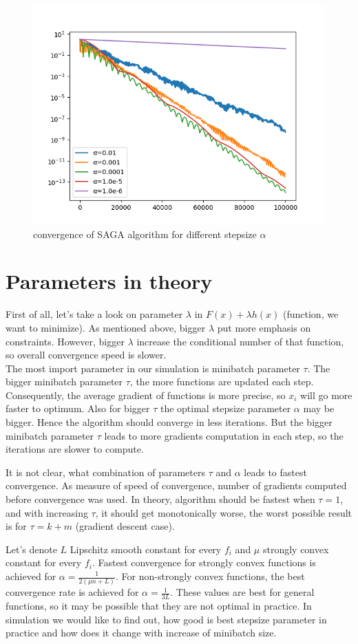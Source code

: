 \documentclass[11pt]{book}
\begin{document}
\begin{figure}[H]
	\centering
	\includegraphics[width=0.7\linewidth]{saga_convergence.png}
	\caption{convergence of SAGA algorithm for different stepsize $\alpha$}
	\label{fig:saga}
\end{figure}

\section{Parameters in theory}

First of all, let's take a look on parameter $\lambda$ in $F(x)+\lambda h(x)$ (function, we want to minimize). As mentioned above, bigger $\lambda$ put more emphasis on constraints. However, bigger $\lambda$ increase the conditional number of that function, so overall convergence speed is slower.\\

The most import parameter in our simulation is minibatch parameter $\tau$. The bigger minibatch parameter $\tau$, the more functions are updated each step. Consequently, the average gradient of functions is more precise, so $x_i$ will go more faster to optimum. Also for bigger $\tau$ the optimal stepsize parameter $\alpha$ may be bigger. Hence the algorithm should converge in less iterations. But the bigger minibatch parameter $\tau$ leads to more gradients computation in each step, so the iterations are slower to compute.

It is not clear, what combination of parameters $\tau$ and $\alpha$ leads to fastest convergence. As measure of speed of convergence, number of gradients computed before convergence was used. In theory, algorithm should be fastest when $\tau=1$, and with increasing $\tau$, it should get monotonically worse, the worst possible result is for $\tau = k+m$ (gradient descent case).

Let's denote $L$ Lipschitz smooth constant for every $f_i$ and $\mu$ strongly convex constant for every $f_i$. Fastest convergence for strongly convex functions is achieved for $\alpha = \frac{1}{2(\mu n + L)}$. For non-strongly convex functions, the best convergence rate is achieved for $\alpha = \frac{1}{3L}$. These values are best for general functions, so it may be possible that they are not optimal in practice. In simulation we would like to find out, how good is best stepsize parameter in practice and how does it change with increase of minibatch size.
\end{document}
